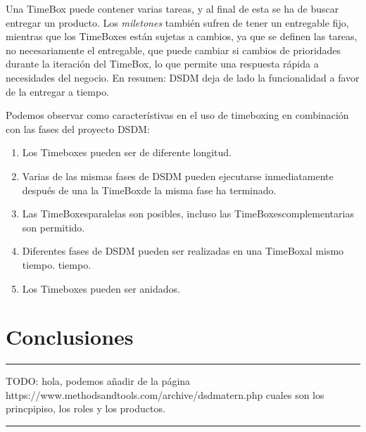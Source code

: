 \documentclass[12pt,a4paper]{article}
\begin{document}
\begin{itemize}
 Una TimeBox puede contener varias tareas, y al final de esta se ha de buscar entregar un producto. Los  \emph{miletones} también
sufren de tener un entregable fijo, mientras que los TimeBoxes están sujetas a cambios, ya que
se definen las tareas, no necesariamente el entregable, que puede cambiar si cambios de prioridades durante la iteración del TimeBox, lo que permite una respuesta rápida a
necesidades del negocio. En resumen: DSDM deja de lado la funcionalidad a favor de la entregar a tiempo. 

Podemos observar como característivas en el uso de timeboxing en combinación con las fases del proyecto DSDM:
\begin{enumerate}
	\item  Los Timeboxes pueden ser de diferente longitud.
	\item  Varias de las mismas fases de DSDM pueden ejecutarse inmediatamente después de una
la TimeBoxde la misma fase ha terminado.
\item Las TimeBoxesparalelas son posibles, incluso las TimeBoxescomplementarias son
permitido.
\item Diferentes fases de DSDM pueden ser realizadas en una TimeBoxal mismo tiempo.
tiempo.
\item Los Timeboxes pueden ser anidados.
\end{enumerate}


\end{itemize}



\section{Conclusiones}

{\color{red} \rule{\linewidth}{0.5mm} }
{\color{blue} TODO: hola, podemos añadir de la página https://www.methodsandtools.com/archive/dsdmatern.php cuales son los princpipiso, los roles y los productos.}\\
{\color{red} \rule{\linewidth}{0.5mm} }
\end{document}
